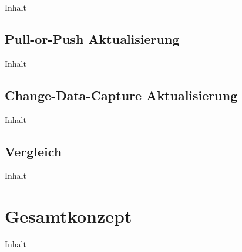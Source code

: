 Inhalt

\subsection{Pull-or-Push Aktualisierung\label{subsec4.3.2:Unterunterpunkt-2}}

Inhalt

\subsection{Change-Data-Capture Aktualisierung\label{subsec4.3.3:Unterunterpunkt-3}}

Inhalt

\subsection{Vergleich\label{subsec4.3.4:Unterunterpunkt-4}}

Inhalt

\section{Gesamtkonzept\label{sec4.4:Unterpunkt-4}}

Inhalt